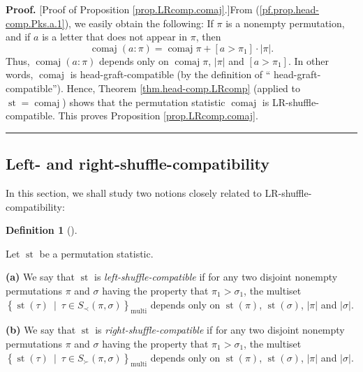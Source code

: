 \documentclass[numbers=enddot,12pt,final,onecolumn,notitlepage]{scrartcl}%
\theoremstyle{definition}
\newtheorem{defi}[theo]{Definition}
\newenvironment{definition}[1][]
{\begin{defi}[#1]\begin{leftbar}}
{\end{leftbar}\end{defi}}
\newenvironment{proof}[1][Proof]{\noindent\textbf{#1.} }{\ \rule{0.5em}{0.5em}}
\begin{document}
\begin{proof}
[Proof of Proposition \ref{prop.LRcomp.comaj}.]From
(\ref{pf.prop.head-comp.Pks.a.1}), we easily obtain the following: If $\pi$ is
a nonempty permutation, and if $a$ is a letter that does not appear in $\pi$,
then%
\[
\operatorname*{comaj}\left(  a:\pi\right)  =\operatorname*{comaj}\pi+\left[
a>\pi_{1}\right]  \cdot\left\vert \pi\right\vert .
\]
Thus, $\operatorname*{comaj}\left(  a:\pi\right)  $ depends only on
$\operatorname*{comaj}\pi$, $\left\vert \pi\right\vert $ and $\left[
a>\pi_{1}\right]  $. In other words, $\operatorname*{comaj}$ is
head-graft-compatible (by the definition of \textquotedblleft
head-graft-compatible\textquotedblright). Hence, Theorem
\ref{thm.head-comp.LRcomp} (applied to $\operatorname*{st}%
=\operatorname*{comaj}$) shows that the permutation statistic
$\operatorname*{comaj}$ is LR-shuffle-compatible. This proves Proposition
\ref{prop.LRcomp.comaj}.
\end{proof}

\subsection{Left- and right-shuffle-compatibility}

In this section, we shall study two notions closely related to LR-shuffle-compatibility:

\begin{definition}
\label{def.LR.left-right}Let $\operatorname*{st}$ be a permutation statistic.

\textbf{(a)} We say that $\operatorname*{st}$ is
\textit{left-shuffle-compatible} if for any two disjoint nonempty permutations
$\pi$ and $\sigma$ having the property that $\pi_{1}>\sigma_{1}$, the multiset
$\left\{  \operatorname*{st}\left(  \tau\right)  \ \mid\ \tau\in S_{\prec
}\left(  \pi,\sigma\right)  \right\}  _{\operatorname*{multi}}$ depends only
on $\operatorname*{st}\left(  \pi\right)  $, $\operatorname*{st}\left(
\sigma\right)  $, $\left\vert \pi\right\vert $ and $\left\vert \sigma
\right\vert $.

\textbf{(b)} We say that $\operatorname*{st}$ is
\textit{right-shuffle-compatible} if for any two disjoint nonempty
permutations $\pi$ and $\sigma$ having the property that $\pi_{1}>\sigma_{1}$,
the multiset $\left\{  \operatorname*{st}\left(  \tau\right)  \ \mid\ \tau\in
S_{\succ}\left(  \pi,\sigma\right)  \right\}  _{\operatorname*{multi}}$
depends only on $\operatorname*{st}\left(  \pi\right)  $, $\operatorname*{st}%
\left(  \sigma\right)  $, $\left\vert \pi\right\vert $ and $\left\vert
\sigma\right\vert $.
\end{definition}
\end{document}
